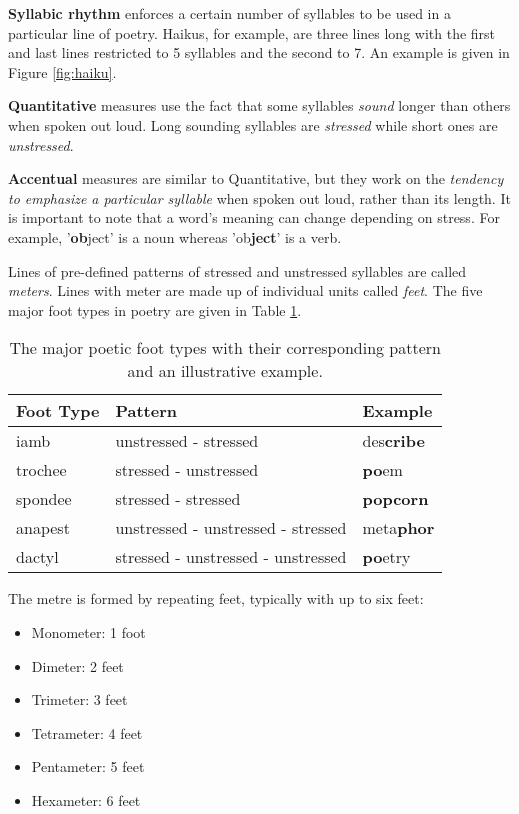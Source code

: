 \textbf{Syllabic rhythm} enforces a certain number of syllables to be used in a particular line of poetry. Haikus, for example, are three lines long with the first and last lines restricted to 5 syllables and the second to 7. An example is given in Figure \ref{fig:haiku}.

\textbf{Quantitative} measures use the fact that some syllables \textit{sound} longer than others when spoken out loud. Long sounding syllables are \textit{stressed} while short ones are \textit{unstressed}. 

\textbf{Accentual} measures are similar to Quantitative, but they work on the \textit{tendency to emphasize a particular syllable} when spoken out loud, rather than its length. It is important to note that a word's meaning can change depending on stress. For example, '\textbf{ob}ject' is a noun whereas 'ob\textbf{ject}' is a verb.

Lines of pre-defined patterns of stressed and unstressed syllables are called \textit{meters}. Lines with meter are made up of individual units called \textit{feet}. The five major foot types in poetry are given in Table \ref{tab:rhythm}.

\begin{table}[h!]
\centering
    \begin{tabular}{|l|l|l|}
    \hline
    Foot Type & Pattern                            & Example  \\ \hline
    iamb      & unstressed - stressed              & des\textbf{cribe} \\ \hline
    trochee   & stressed - unstressed              & \textbf{po}em     \\ \hline
    spondee   & stressed - stressed                & \textbf{popcorn}  \\ \hline
    anapest   & unstressed - unstressed - stressed & meta\textbf{phor} \\ \hline
    dactyl    & stressed - unstressed - unstressed & \textbf{po}etry   \\ \hline
    \end{tabular}
\caption{The major poetic foot types with their corresponding pattern and an illustrative example.}
\label{tab:rhythm}
\end{table}


The metre is formed by repeating feet, typically with up to six feet:
\begin{itemize}
\setlength{\itemsep}{0pt}
\item{Monometer: 1 foot}
\item{Dimeter: 2 feet}
\item{Trimeter: 3 feet}
\item{Tetrameter: 4 feet}
\item{Pentameter: 5 feet}
\item{Hexameter: 6 feet}
\end{itemize}

